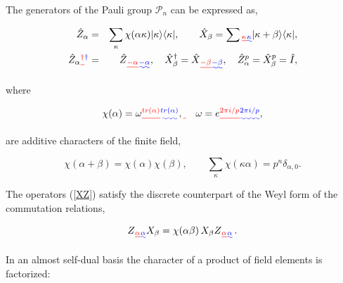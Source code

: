 \documentclass[quantumrep,article,submit,pdftex,moreauthors]{Definitions/mdpi}
\providecommand{\DIFadd}[1]{{\protect\color{blue}\uwave{#1}}} %
\providecommand{\DIFdel}[1]{{\protect\color{red}\sout{#1}}}                      %
\providecommand{\DIFaddbegin}{} %
\providecommand{\DIFaddend}{} %
\providecommand{\DIFdelbegin}{} %
\providecommand{\DIFdelend}{} %
\begin{document}
The generators of the Pauli group $\mathcal{P}_{n}$ can be expressed as,

\begin{eqnarray}
  \hat{Z}_{\alpha }
  &=& \sum_{\kappa } \chi\left( \alpha \kappa \right)
  |\kappa \rangle \langle \kappa|,
  \qquad \hat{X}_{\beta }
  = \sum\DIFdelbegin \DIFdel{_{\kappa }}\DIFdelend \DIFaddbegin \DIFadd{_{\kappa} }\DIFaddend |\kappa + \beta \rangle \langle \kappa|,
  \label{XZ} \\
  \hat{Z}_{\alpha }\DIFdelbegin \DIFdel{^{\dagger } }\DIFdelend \DIFaddbegin \DIFadd{^{\dagger}
  }\DIFaddend &=& \hat{Z}\DIFdelbegin \DIFdel{_{-\alpha }}\DIFdelend \DIFaddbegin \DIFadd{_{-\alpha}}\DIFaddend , \quad \hat{X}_{\beta }^{\dagger}
  = \hat{X}\DIFdelbegin \DIFdel{_{-\beta }}\DIFdelend \DIFaddbegin \DIFadd{_{-\beta}}\DIFaddend , \quad \hat{Z}_{\alpha}^{p}
  = \hat{X}_{\beta}^{p} = \hat{I},
\end{eqnarray}

where

\begin{equation*}
  \chi \left( \alpha \right)
  = \omega\DIFdelbegin \DIFdel{^{tr\left( \alpha \right) }}\DIFdelend \DIFaddbegin \DIFadd{^{tr\left( \alpha \right)}}\DIFaddend ,
  \DIFdelbegin \DIFdel{\;}\DIFdelend \DIFaddbegin \quad \DIFaddend \omega = e\DIFdelbegin \DIFdel{^{2\pi i/p}}\DIFdelend \DIFaddbegin \DIFadd{^{2\pi i / p}}\DIFaddend ,
\end{equation*}

are additive characters of the finite field,

\begin{equation*}
  \chi\left( \alpha +\beta \right)
  = \chi\left( \alpha \right) \chi\left( \beta \right),
  \qquad \sum_{\kappa }\chi \left( \kappa \alpha \right)
  = p^{n}\delta_{\alpha, 0}.
\end{equation*}

The operators (\ref{XZ}) satisfy the discrete counterpart of the Weyl form of
the commutation relations,

\begin{equation}
  Z\DIFdelbegin \DIFdel{_{\alpha }}\DIFdelend \DIFaddbegin \DIFadd{_{\alpha}}\DIFaddend X_{\beta }
  = \chi \left( \alpha \beta \right) \, X_{\beta }Z\DIFdelbegin \DIFdel{_{\alpha
}}\DIFdelend \DIFaddbegin \DIFadd{_{\alpha} }\DIFaddend \,.
  \label{commutation_relation}
\end{equation}

In an almost self-dual basis the character of a product of field elements is
factorized:
\end{document}
